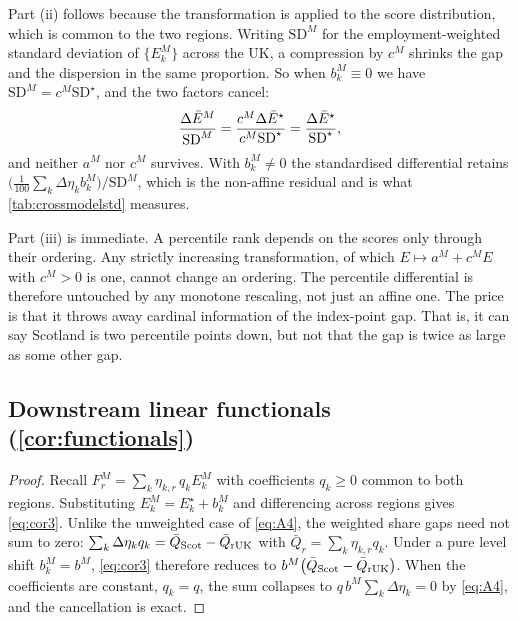 Part (ii) follows because the transformation is applied to the score distribution, which is common to the two regions. Writing $\mathrm{SD}^{M}$ for the employment-weighted standard deviation of $\{E^{M}_k\}$ across the UK, a compression by $c^{M}$ shrinks the gap and the dispersion in the same proportion. So when $b^{M}_k \equiv 0$ we have $\mathrm{SD}^{M} = c^{M} \mathrm{SD}^{\star}$, and the two factors cancel:
\begin{equation}\label{eq:A6c}
\frac{\Delta\bar{E}^{M}}{\mathrm{SD}^{M}}
= \frac{c^{M} \Delta\bar{E}^{\star}}{c^{M} \mathrm{SD}^{\star}}
= \frac{\Delta\bar{E}^{\star}}{\mathrm{SD}^{\star}} ,
\end{equation}
and neither $a^{M}$ nor $c^{M}$ survives. With $b^{M}_k \ne 0$ the standardised differential retains \\ $\bigl(\tfrac{1}{100}\sum_k \Delta\eta_k b^{M}_k\bigr) / \mathrm{SD}^{M}$, which is the non-affine residual and is what \cref{tab:crossmodelstd} measures.
 

Part (iii) is immediate. A percentile rank depends on the scores only through their ordering. Any strictly increasing transformation, of which $E \mapsto a^{M} + c^{M} E$ with $c^{M} > 0$ is one, cannot change an ordering. The percentile differential is therefore untouched by any monotone rescaling, not just an affine one. The price is that it throws away cardinal information of the index-point gap. That is, it can say Scotland is two percentile points down, but not that the gap is twice as large as some other gap.
 

\subsection{Downstream linear functionals (\texorpdfstring{\cref{cor:functionals}}{Corollary 3})}

\begin{proof}
Recall $F^{M}_r = \sum_k \eta_{k,r}\, q_k E^{M}_k$ with coefficients $q_k \ge 0$ common
to both regions. Substituting $E^{M}_k = E^{\star}_k + b^{M}_k$ and differencing across
regions gives \cref{eq:cor3}. Unlike the unweighted case of \cref{eq:A4}, the weighted
share gaps need not sum to zero: $\sum_k \Delta\eta_k q_k = \bar{Q}_{\mathrm{Scot}} - \bar{Q}_{\mathrm{rUK}}$
with $\bar{Q}_r = \sum_k \eta_{k,r} q_k$. Under a pure level shift $b^{M}_k = b^{M}$,
\cref{eq:cor3} therefore reduces to $b^{M} \bigl(\bar{Q}_{\mathrm{Scot}} - \bar{Q}_{\mathrm{rUK}}\bigr)$. When the coefficients are constant, $q_k = q$, the sum collapses to
$q\, b^{M} \sum_k \Delta\eta_k = 0$ by \cref{eq:A4}, and the cancellation is exact.
\end{proof}

